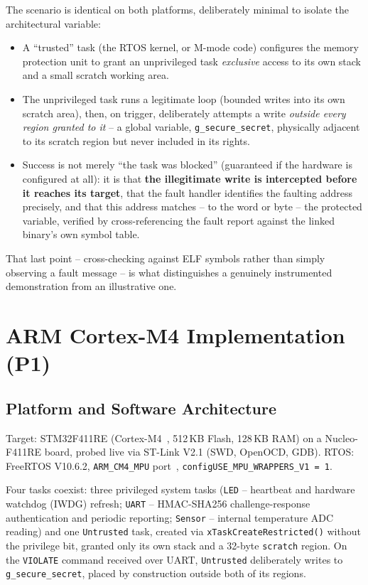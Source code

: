 \documentclass[sigconf,nonacm]{acmart}
\begin{document}
The scenario is identical on both platforms, deliberately minimal to isolate the architectural variable:

\begin{itemize}
  \item A ``trusted'' task (the RTOS kernel, or M-mode code) configures the memory protection unit to grant an unprivileged task \emph{exclusive} access to its own stack and a small scratch working area.
  \item The unprivileged task runs a legitimate loop (bounded writes into its own scratch area), then, on trigger, deliberately attempts a write \emph{outside every region granted to it} -- a global variable, \texttt{g\_secure\_secret}, physically adjacent to its scratch region but never included in its rights.
  \item Success is not merely ``the task was blocked'' (guaranteed if the hardware is configured at all): it is that \textbf{the illegitimate write is intercepted before it reaches its target}, that the fault handler identifies the faulting address precisely, and that this address matches -- to the word or byte -- the protected variable, verified by cross-referencing the fault report against the linked binary's own symbol table.
\end{itemize}

That last point -- cross-checking against ELF symbols rather than simply observing a fault message -- is what distinguishes a genuinely instrumented demonstration from an illustrative one.

\section{ARM Cortex-M4 Implementation (P1)}
\label{sec:p1}

\subsection{Platform and Software Architecture}

Target: STM32F411RE (Cortex-M4~\cite{arm-armv7m}, 512\,KB Flash, 128\,KB RAM) on a Nucleo-F411RE board, probed live via ST-Link V2.1 (SWD, OpenOCD, GDB). RTOS: FreeRTOS V10.6.2, \texttt{ARM\_CM4\_MPU} port~\cite{freertos-mpu}, \texttt{configUSE\_MPU\_WRAPPERS\_V1 = 1}.

Four tasks coexist: three privileged system tasks (\texttt{LED} -- heartbeat and hardware watchdog (IWDG) refresh; \texttt{UART} -- HMAC-SHA256 challenge-response authentication and periodic reporting; \texttt{Sensor} -- internal temperature ADC reading) and one \texttt{Untrusted} task, created via \texttt{xTaskCreateRestricted()} without the privilege bit, granted only its own stack and a 32-byte \texttt{scratch} region. On the \texttt{VIOLATE} command received over UART, \texttt{Untrusted} deliberately writes to \texttt{g\_secure\_secret}, placed by construction outside both of its regions.
\end{document}
